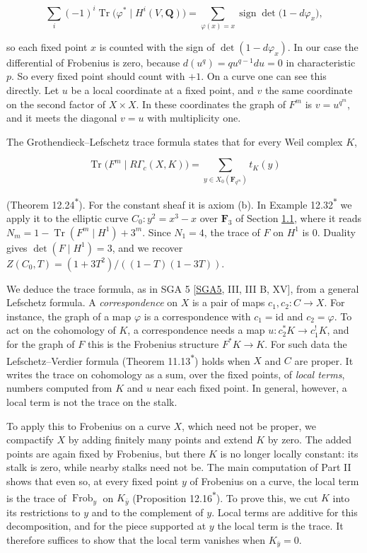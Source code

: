 \documentclass[11pt]{article}
\newcommand{\bpout}[1]{#1\textsuperscript{\hyperlink{bp-outside}{\ensuremath{\ast}}}}
\begin{document}
\[
\sum_i(-1)^i\operatorname{Tr}\bigl(\varphi^*\mid H^i(V,\mathbf Q)\bigr)
=\sum_{\varphi(x)=x}\operatorname{sign}\det\bigl(1-d\varphi_x\bigr),
\]

so each fixed point \(x\) is counted with the sign of \(\det(1-d\varphi_x)\). In our case the differential of Frobenius is zero, because \(d(u^q)=qu^{q-1}du=0\) in characteristic \(p\). So every fixed point should count with \(+1\). On a curve one can see this directly. Let \(u\) be a local coordinate at a fixed point, and \(v\) the same coordinate on the second factor of \(X\times X\). In these coordinates the graph of \(F^m\) is \(v=u^{q^m}\), and it meets the diagonal \(v=u\) with multiplicity one.

The Grothendieck–Lefschetz trace formula states that for every Weil complex \(K\),

\[
\operatorname{Tr}\bigl(F^m\mid R\Gamma_c(X,K)\bigr)
=\sum_{y\in X_0(\mathbf F_{q^m})}t_K(y)
\]

(Theorem \bpout{12.24}). For the constant sheaf it is axiom (b). In Example \bpout{12.32} we apply it to the elliptic curve \(C_0\colon y^2=x^3-x\) over \(\mathbf F_3\) of Section \hyperref[bp3]{1.1}, where it reads \(N_m=1-\operatorname{Tr}(F^m\mid H^1)+3^m\). Since \(N_1=4\), the trace of \(F\) on \(H^1\) is \(0\). Duality gives \(\det(F\mid H^1)=3\), and we recover \(Z(C_0,T)=(1+3T^2)/((1-T)(1-3T))\).

We deduce the trace formula, as in SGA 5 [\hyperref[bp27]{SGA5}, III, III B, XV], from a general Lefschetz formula. A \emph{correspondence} on \(X\) is a pair of maps \(c_1,c_2:C\to X\). For instance, the graph of a map \(\varphi\) is a correspondence with \(c_1=\mathrm{id}\) and \(c_2=\varphi\). To act on the cohomology of \(K\), a correspondence needs a map \(u:c_2^*K\to c_1^!K\), and for the graph of \(F\) this is the Frobenius structure \(F^*K\to K\). For such data the Lefschetz–Verdier formula (Theorem \bpout{11.13}) holds when \(X\) and \(C\) are proper. It writes the trace on cohomology as a sum, over the fixed points, of \emph{local terms}, numbers computed from \(K\) and \(u\) near each fixed point. In general, however, a local term is not the trace on the stalk.

To apply this to Frobenius on a curve \(X\), which need not be proper, we compactify \(X\) by adding finitely many points and extend \(K\) by zero. The added points are again fixed by Frobenius, but there \(K\) is no longer locally constant: its stalk is zero, while nearby stalks need not be. The main computation of Part II shows that even so, at every fixed point \(y\) of Frobenius on a curve, the local term is the trace of \(\operatorname{Frob}_y\) on \(K_{\bar y}\) (Proposition \bpout{12.16}). To prove this, we cut \(K\) into its restrictions to \(y\) and to the complement of \(y\). Local terms are additive for this decomposition, and for the piece supported at \(y\) the local term is the trace. It therefore suffices to show that the local term vanishes when \(K_{\bar y}=0\).
\end{document}
